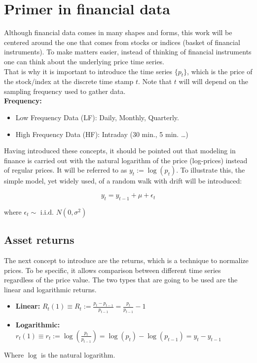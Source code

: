\chapter{Primer in financial data}
\label{chapterIntroFinDat}
Although financial data comes in many shapes and forms, this work will be 
centered around the one that comes from stocks or indices (basket of 
financial instruments). To make matters easier, instead of thinking of 
financial instruments one can think about the underlying price time series.
\\

That is why it is important to introduce the time series $\{ p_t \}$, which 
is the price of the stock/index at the discrete time stamp $t$. Note that $t$ 
will will depend on the sampling frequency used to gather data.\\

\textbf{Frequency:}
\begin{itemize}
	\item Low Frequency Data (LF): Daily, Monthly, Quarterly.
	\item High Frequency Data (HF): Intraday (30 min., 5 min. \ldots)
\end{itemize}

\vspace{.4cm}

Having introduced these concepts, it should be pointed out that modeling in 
finance is carried out with the natural logarithm of the price (log-prices) 
instead of regular prices. It will be referred to as $y_t := \log (p_t)$. To 
illustrate this, the simple model, yet widely used, of a random walk with 
drift will be introduced:

\begin{equation*}
	y_t = y_{t - 1} + \mu + \epsilon_t	
\end{equation*}

where $\epsilon_t \sim \text{ i.i.d. } N(0, \sigma^2)$

\section{Asset returns}
The next concept to introduce are the returns, which is a technique to 
normalize prices. To be specific, it allows comparison between different 
time series regardless of the price value. The two types that are going to 
be used are the linear and logarithmic returns.

\begin{itemize}
	\item \textbf{Linear:} $R_t(1) \equiv R_t := \frac{p_t - p_{t-1}}
	{p_{t - 1}} = \frac{p_t}{p_{t - 1}} - 1$
	\item \textbf{Logarithmic:} 
	$r_t(1) \equiv r_t := \log \left( \frac{p_t}{p_{t-1}} \right) = 
	\log (p_t) - \log (p_{t - 1}) = y_t - y_{t - 1}$
\end{itemize}
Where $\log$ is the natural logarithm.\\

